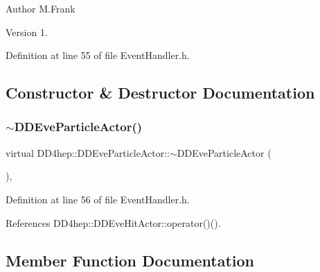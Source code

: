 \begin{DoxyAuthor}{Author}
M.\+Frank 
\end{DoxyAuthor}
\begin{DoxyVersion}{Version}
1. 
\end{DoxyVersion}


Definition at line 55 of file Event\+Handler.\+h.



\subsection{Constructor \& Destructor Documentation}
\hypertarget{struct_d_d4hep_1_1_d_d_eve_particle_actor_a98cc089b4106ef7c3e468ced02532917}{}\label{struct_d_d4hep_1_1_d_d_eve_particle_actor_a98cc089b4106ef7c3e468ced02532917} 
\subsubsection{\texorpdfstring{$\sim$\+D\+D\+Eve\+Particle\+Actor()}{~DDEveParticleActor()}}
{\footnotesize\ttfamily virtual D\+D4hep\+::\+D\+D\+Eve\+Particle\+Actor\+::$\sim$\+D\+D\+Eve\+Particle\+Actor (\begin{DoxyParamCaption}{ }\end{DoxyParamCaption})\hspace{0.3cm}{\ttfamily [inline]}, {\ttfamily [virtual]}}



Definition at line 56 of file Event\+Handler.\+h.



References D\+D4hep\+::\+D\+D\+Eve\+Hit\+Actor\+::operator()().



\subsection{Member Function Documentation}
\hypertarget{struct_d_d4hep_1_1_d_d_eve_particle_actor_a27707fecbdb50e7566ec01c784fcc669}{}\label{struct_d_d4hep_1_1_d_d_eve_particle_actor_a27707fecbdb50e7566ec01c784fcc669} 
